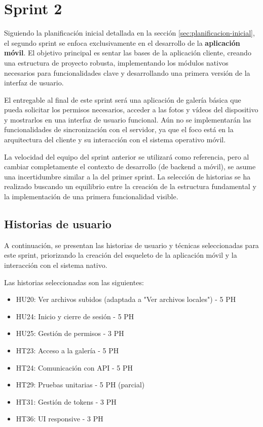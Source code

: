 \newpage
\section{Sprint 2}
\label{sec:sprint2}

Siguiendo la planificación inicial detallada en la sección \ref{sec:planificacion-inicial}, el segundo sprint se enfoca exclusivamente en el desarrollo de la \textbf{aplicación móvil}. El objetivo principal es sentar las bases de la aplicación cliente, creando una estructura de proyecto robusta, implementando los módulos nativos necesarios para funcionalidades clave y desarrollando una primera versión de la interfaz de usuario.

El entregable al final de este sprint será una aplicación de galería básica que pueda solicitar los permisos necesarios, acceder a las fotos y vídeos del dispositivo y mostrarlos en una interfaz de usuario funcional. Aún no se implementarán las funcionalidades de sincronización con el servidor, ya que el foco está en la arquitectura del cliente y su interacción con el sistema operativo móvil.

La velocidad del equipo del sprint anterior se utilizará como referencia, pero al cambiar completamente el contexto de desarrollo (de backend a móvil), se asume una incertidumbre similar a la del primer sprint. La selección de historias se ha realizado buscando un equilibrio entre la creación de la estructura fundamental y la implementación de una primera funcionalidad visible.

\subsection{Historias de usuario}
A continuación, se presentan las historias de usuario y técnicas seleccionadas para este sprint, priorizando la creación del esqueleto de la aplicación móvil y la interacción con el sistema nativo.

Las historias seleccionadas son las siguientes:
\begin{itemize}
    \item HU20: Ver archivos subidos (adaptada a "Ver archivos locales") - 5 PH
    \item HU24: Inicio y cierre de sesión - 5 PH
    \item HU25: Gestión de permisos - 3 PH
    \item HT23: Acceso a la galería - 5 PH
    \item HT24: Comunicación con API - 5 PH
    \item HT29: Pruebas unitarias - 5 PH (parcial)
    \item HT31: Gestión de tokens - 3 PH
    \item HT36: UI responsive - 3 PH
\end{itemize}

